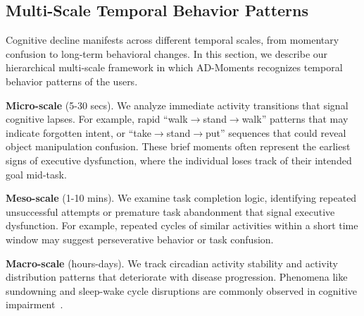\documentclass[sigconf, anonymous, 9pt, nonacm]{acmart}
\newcommand{\sys}{AD-Moments\xspace}
\begin{document}
\subsection{Multi-Scale Temporal Behavior Patterns}

Cognitive decline manifests across different temporal scales, from momentary confusion to long-term behavioral changes. 
In this section, we describe our hierarchical multi-scale framework in which \sys recognizes temporal behavior patterns of the users.

\noindent\textbf{Micro-scale} (5-30 secs). We analyze immediate activity transitions that signal cognitive lapses. For example, rapid ``walk$\rightarrow$stand$\rightarrow$walk'' patterns that may indicate forgotten intent, or ``take$\rightarrow$stand$\rightarrow$put'' sequences that could reveal object manipulation confusion.
These brief moments often represent the earliest signs of executive dysfunction, where the individual loses track of their intended goal mid-task.

\noindent\textbf{Meso-scale} (1-10 mins). We examine task completion logic, identifying repeated unsuccessful attempts or premature task abandonment that signal executive dysfunction. For example, repeated cycles of similar activities within a short time window may suggest perseverative behavior or task confusion.

\noindent\textbf{Macro-scale} (hours-days). We track circadian activity stability and activity distribution patterns that deteriorate with disease progression. Phenomena like sundowning and sleep-wake cycle disruptions are commonly observed in cognitive impairment~\cite{Khachiyants2011Sundown,Musiek2015Sleep}.
\end{document}
